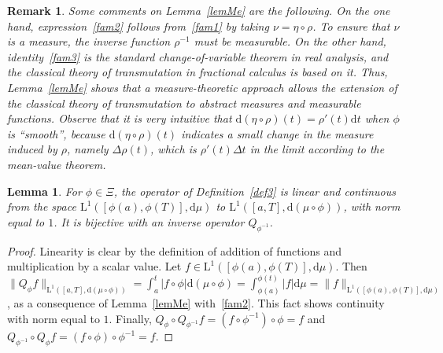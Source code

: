 \documentclass[12pt,reqno]{amsart}
\theoremstyle{plain}
\newtheorem{lemma}[theorem]{Lemma} %
\newtheorem{remark}[theorem]{Remark}
\numberwithin{equation}{section} %
\begin{document}
\begin{remark} \normalfont
Some comments on Lemma~\ref{lemMe} are the following. On the one hand, expression~\eqref{fam2} follows from~\eqref{fam1} by taking $\nu=\eta\circ \rho$. To ensure that $\nu$ is a measure, the inverse function $\rho^{-1}$ must be measurable. On the other hand, identity~\eqref{fam3} is the standard change-of-variable theorem in real analysis, and the classical theory of transmutation in fractional calculus is based on it. Thus, Lemma~\ref{lemMe} shows that a measure-theoretic approach allows the extension of the classical theory of transmutation to abstract measures and measurable functions. Observe that it is very intuitive that $\mathrm{d}(\eta\circ \rho)(t)=\rho'(t)\mathrm{d}t$ when $\phi$ is ``smooth'', because $\mathrm{d}(\eta\circ \rho)(t)$ indicates a small change in the measure induced by $\rho$, namely $\Delta\rho(t)$, which is $\rho'(t)\Delta t$ in the limit according to the mean-value theorem.
\end{remark}

\begin{lemma} \label{qp}
For $\phi\in\Xi$, the operator of Definition~\ref{def3} is linear and continuous from the space $\mathrm{L}^1([\phi(a),\phi(T)],\mathrm{d}\mu)$ to $\mathrm{L}^1([a,T],\mathrm{d}(\mu\circ\phi))$, with norm equal to $1$. It is bijective with an inverse operator $Q_{\phi^{-1}}$.
\end{lemma}
\begin{proof}
Linearity is clear by the definition of addition of functions and multiplication by a scalar value. Let $f \in \mathrm{L}^1([\phi(a),\phi(T)],\mathrm{d}\mu)$. Then $\|Q_\phi f\|_{\mathrm{L}^1([a,T],\mathrm{d}(\mu\circ\phi))}=  \int_a^t |f\circ \phi|\mathrm{d}(\mu\circ\phi) 
=  \int_{\phi(a)}^{\phi(t)} |f|\mathrm{d}\mu=\|f\|_{\mathrm{L}^1([\phi(a),\phi(T)],\mathrm{d}\mu)}$,
as a consequence of Lemma~\ref{lemMe} with~\eqref{fam2}. This fact shows continuity with norm equal to $1$. Finally, $Q_{\phi}\circ Q_{\phi^{-1}}f=(f\circ\phi^{-1})\circ\phi=f$
and
$Q_{\phi^{-1}}\circ Q_\phi f=(f\circ\phi)\circ \phi^{-1}=f$.
\end{proof}
\end{document}
